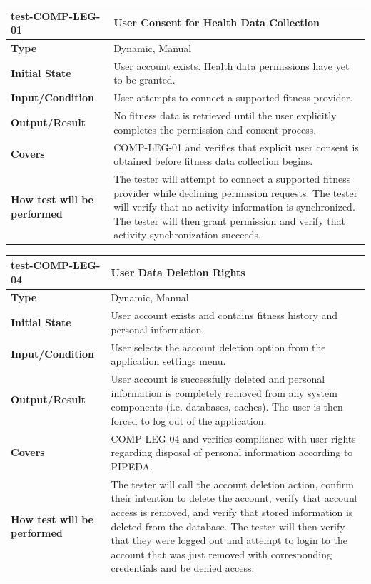 \documentclass[12pt, titlepage]{article}
\begin{document}
\noindent\begin{tabularx}{\textwidth}{>{\raggedright\arraybackslash}p{3.5cm}X}
  \toprule
  \textbf{test-COMP-LEG-01} & \textbf{User Consent for Health Data Collection}\\
  \midrule
  \textbf{Type} & Dynamic, Manual\\
  \textbf{Initial State} & User account exists. Health data permissions have yet to be granted.\\
  \textbf{Input/Condition} & User attempts to connect a supported fitness provider.\\
  \textbf{Output/Result} & No fitness data is retrieved until the user explicitly completes the permission and consent process.\\
  \textbf{Covers} & COMP-LEG-01 and verifies that explicit user consent is obtained before fitness data collection begins.\\
  \textbf{How test will be performed} & The tester will attempt to connect a supported fitness provider while declining permission requests. The tester will verify that no activity information is synchronized. The tester will then grant permission and verify that activity synchronization succeeds.\\
  \bottomrule
\end{tabularx}

\vspace{1em}

\noindent\begin{tabularx}{\textwidth}{>{\raggedright\arraybackslash}p{3.5cm}X}
  \toprule
  \textbf{test-COMP-LEG-04} & \textbf{User Data Deletion Rights}\\
  \midrule
  \textbf{Type} & Dynamic, Manual\\
  \textbf{Initial State} & User account exists and contains fitness history and personal information.\\
  \textbf{Input/Condition} & User selects the account deletion option from the application settings menu.\\
  \textbf{Output/Result} & User account is successfully deleted and personal information is completely removed from any system components (i.e. databases, caches). The user is then forced to log out of the application.\\
  \textbf{Covers} & COMP-LEG-04 and verifies compliance with user rights regarding disposal of personal information according to PIPEDA.\\
  \textbf{How test will be performed} & The tester will call the account deletion action, confirm their intention to delete the account, verify that account access is removed, and verify that stored information is deleted from the database. The tester will then verify that they were logged out and attempt to login to the account that was just removed with corresponding credentials and be denied access.\\
  \bottomrule
\end{tabularx}
\end{document}
